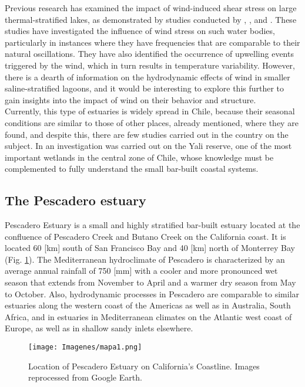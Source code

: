 \documentclass[tesis.tex]{subfiles}
\begin{document}
Previous research has examined the impact of wind-induced shear stress on large thermal-stratified lakes, as demonstrated by studies conducted by \cite{Coman2012}, \cite{Laval2008}, and \cite{avalos2019natural}. These studies have investigated the influence of wind stress on such water bodies, particularly in instances where they have frequencies that are comparable to their natural oscillations. They have also identified the occurrence of upwelling events triggered by the wind, which in turn results in temperature variability. However, there is a dearth of information on the hydrodynamic effects of wind in smaller saline-stratified lagoons, and it would be interesting to explore this further to gain insights into the impact of wind on their behavior and structure.\\

Currently, this type of estuaries is widely spread in Chile, because their seasonal conditions are similar to those of other places, already mentioned, where they are found, and despite this, there are few studies carried out in the country on the subject. In \cite{dussaillant2009} an investigation was carried out on the Yali reserve, one of the most important wetlands in the central zone of Chile, whose knowledge must be complemented to fully understand the small bar-built coastal systems.\\

\subsection{The Pescadero estuary}

Pescadero Estuary is a small and highly stratified bar-built estuary located at the confluence of Pescadero Creek and Butano Creek on the California coast. It is located 60 [km] south of San Francisco Bay and 40 [km] north of Monterrey Bay (Fig. \ref{fig:locPDO}). The Mediterranean hydroclimate of Pescadero is characterized by an average annual rainfall of 750 [mm] with a cooler and more pronounced wet season that extends from November to April and a warmer dry season from May to October. Also, hydrodynamic processes in Pescadero are comparable to similar estuaries along the western coast of the Americas as well as in Australia, South Africa, and in estuaries in Mediterranean climates on the Atlantic west coast of Europe, as well as in shallow sandy inlets elsewhere.\\

\begin{figure}[h!]
\centering
\texttt{[image: Imagenes/mapa1.png]}
\caption{Location of Pescadero Estuary on California's Coastline. Images reprocessed from Google Earth.}
\label{fig:locPDO}
\end{figure}
\end{document}

